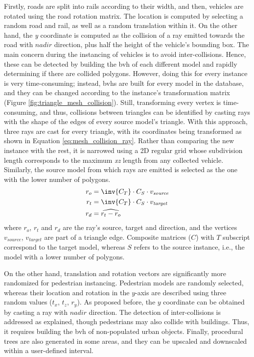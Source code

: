 Firstly, roads are split into rails according to their width, and then, vehicles are rotated using the road rotation matrix. The location is computed by selecting a random road and rail, as well as a random translation within it. On the other hand, the \textit{y} coordinate is computed as the collision of a ray emitted towards the road with $\textit{nadir}$ direction, plus half the height of the vehicle's bounding box. The main concern during the instancing of vehicles is to avoid inter-collisions. Hence, these can be detected by building the \acrshort{bvh} of each different model and rapidly determining if there are collided polygons. However, doing this for every instance is very time-consuming; instead, \acrshort{bvh}s are built for every model in the database, and they can be changed according to the instance's transformation matrix (Figure \ref{fig:triangle_mesh_collision}). Still, transforming every vertex is time-consuming, and thus, collisions between triangles can be identified by casting rays with the shape of the edges of every source model's triangle. With this approach, three rays are cast for every triangle, with its coordinates being transformed as shown in Equation \ref{eq:mesh_collision_ray}. Rather than comparing the new instance with the rest, it is narrowed using a 2D regular grid whose subdivision length corresponds to the maximum \textit{xz} length from any collected vehicle. Similarly, the source model from which rays are emitted is selected as the one with the lower number of polygons.
\begin{gather}
    \label{eq:mesh_collision_ray}
    \begin{aligned}
        r_{o} &= \inv{C_{T}} \cdot C_{S} \cdot v_{\textit{source}}\\
        r_{t} &= \inv{C_{T}} \cdot C_{S} \cdot v_{\textit{target}}\\
        r_{d} &= \widehat{r_{t} - r_{o}}
    \end{aligned}
\end{gather}
where $r_{o}$, $r_{t}$ and $r_{d}$ are the ray's source, target and direction, and the vertices $v_{\textit{source}}$, $v_{\textit{target}}$ are part of a triangle edge. Composite matrices ($C$) with $T$ subscript correspond to the target model, whereas $S$ refers to the source instance, i.e., the model with a lower number of polygons.

On the other hand, translation and rotation vectors are significantly more randomized for pedestrian instancing. Pedestrian models are randomly selected, whereas their location and rotation in the $y$-axis are described using three random values ($t_x$, $t_z$, $r_y$). As proposed before, the $y$ coordinate can be obtained by casting a ray with $\textit{nadir}$ direction. The detection of inter-collisions is addressed as explained, though pedestrians may also collide with buildings. Thus, it requires building the \acrshort{bvh} of non-populated urban objects. Finally, procedural trees are also generated in some areas, and they can be upscaled and downscaled within a user-defined interval.


